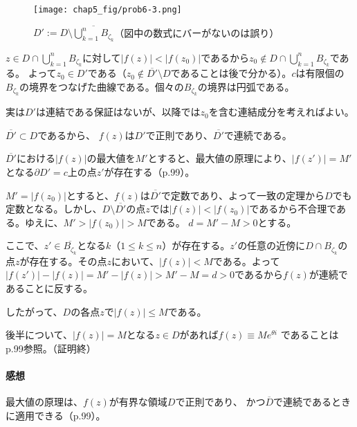 \begin{figure}[h]
    \centering
    \texttt{[image: chap5\_fig/prob6-3.png]}
    \caption{$D':=D\setminus\overline{\bigcup_{k=1}^{n}B_{\zeta_k}}$（図中の数式にバーがないのは誤り）}
    \label{fig:chap5-6-3}
\end{figure}

$z\in D\cap \bigcup_{k=1}^{n}B_{\zeta_k}$に対して$|f(z)|<|f(z_0)|$であるから$z_0\not\in D\cap \bigcup_{k=1}^{n}B_{\zeta_k}$である。
よって$z_0\in D'$である（$z_0\notin\overline{D'}\setminus D$であることは後で分かる）。$c$は有限個の$B_{\zeta_k}$の境界をつなげた曲線である。個々の$B_{\zeta_k}$の境界は円弧である。

実は$D'$は連結である保証はないが、以降では$z_0$を含む連結成分を考えればよい。

$\overline{D'}\subset D$であるから、
$f(z)$は$D'$で正則であり、$\overline{D'}$で連続である。

$\overline{D'}$における$|f(z)|$の最大値を$M'$とすると、最大値の原理により、$|f(z')|=M'$となる$\partial D'=c$上の点$z'$が存在する（p.99）。

$M'=|f(z_0)|$とすると、$f(z)$は$\overline{D'}$で定数であり、よって一致の定理から$D$でも定数となる。しかし、$D\setminus\overline{D'}$の点$z$では$|f(z)|<|f(z_0)|$であるから不合理である。ゆえに、$M'>|f(z_0)|>M$である。
$d=M'-M>0$とする。

ここで、$z'\in\overline{B_{\zeta_k}}$となる$k$（$1\le k\le n$）が存在する。$z'$の任意の近傍に$D\cap B_{\zeta_k}$の点$z$が存在する。その点$z$において、$|f(z)|<M$である。よって$|f(z')|-|f(z)|=M'-|f(z)|>M'-M=d>0$であるから$f(z)$が連続であることに反する。

したがって、$D$の各点$z$で$|f(z)|\le M$である。



後半について、$|f(z)|=M$となる$z\in D$があれば$f(z)\equiv Me^{\theta i}$
であることはp.99参照。（証明終）

\paragraph{感想}
最大値の原理は、$f(z)$が有界な領域$D$で正則であり、
かつ$\overline{D}$で連続であるときに適用できる（p.99）。

